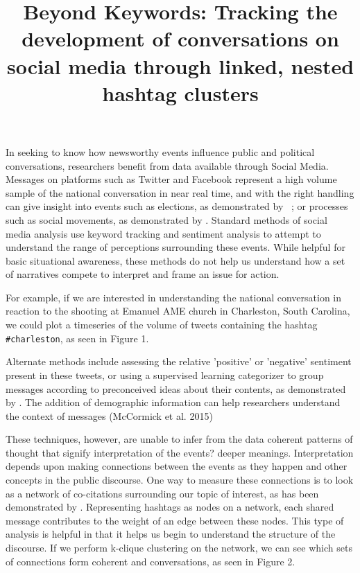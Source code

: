\documentclass[12pt]{article}
\title{Beyond Keywords: Tracking the development of conversations on social media through linked, nested hashtag clusters}
\begin{document}
\maketitle

\doublespacing

	In seeking to know how newsworthy events influence public and political conversations, researchers benefit from data available through Social Media.
Messages on platforms such as Twitter and Facebook represent a high volume sample  of the national conversation in near real time, and with the right handling can give insight into events such as elections, as demonstrated by ~\cite{Huberty2013,Tumasjan2010}; or processes such as social movements, as demonstrated by \cite{Agarwal2014,DiGrazia2015}. 
Standard methods of social media analysis use keyword tracking and sentiment analysis to attempt to understand the range of perceptions surrounding these events. 
While helpful for basic situational awareness, these methods do not help us understand how a set of narratives compete to interpret and frame an issue for action.

For example, if we are interested in understanding the national conversation in reaction to the shooting at Emanuel AME church in Charleston, South Carolina, we could plot a timeseries of the volume of tweets containing the hashtag \texttt{\#charleston}, as seen in Figure 1.

Alternate methods include assessing the relative 'positive' or 'negative' sentiment present in these tweets, or using a supervised learning categorizer to group messages according to preconceived ideas about their contents, as demonstrated by \cite{Becker2011,Ritter2010,Zubiaga2011}. 
The addition of demographic information can help researchers understand the context of messages (McCormick et al. 2015)

These techniques, however, are unable to infer from the data coherent patterns of thought that signify interpretation of the events? deeper meanings. 
Interpretation depends upon making connections between the events as they happen and other concepts in the public discourse. 
One way to measure these connections is to look as a network of co-citations surrounding our topic of interest, as has been demonstrated by \cite{Cogan2012,Smith2014}. 
Representing hashtags as nodes on a network, each shared message contributes to the weight of an edge between these nodes. 
This type of analysis is helpful in that it helps us begin to understand the structure of the discourse. 
If we perform k-clique clustering on the network, we can see which sets of connections form coherent and conversations, as seen in Figure 2.
\end{document}
